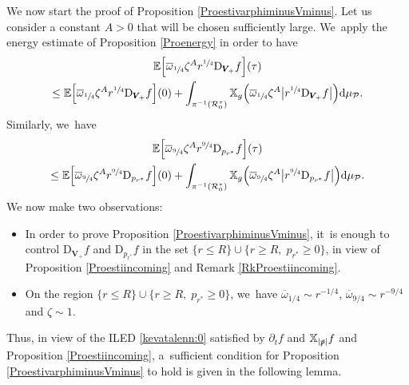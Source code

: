 \documentclass[JEP,XML,SOM,Unicode,published]{cedram}
\theoremstyle{plain}
\theoremstyle{definition}
\newcommand\z{{\zeta}}
\newcommand\T{{\mathbb{X}}}
\newcommand\dr{{\mathrm{d}}}
\begin{document}
We now start the proof of Proposition \ref{ProestivarphiminusVminus}. Let us consider a constant $A>0$ that will be chosen sufficiently large. We~apply the energy estimate of Proposition \ref{Proenergy} in order to have
\begin{multline*}
\mathbb{E} \Bigl[ \overline{\omega}_{\sfrac{1}{4}} \z^A r^{\sfrac{1}{4}}\mathrm{D}_{\pmb{V}_{\!+}} f \Bigr](\tau)\\
\leq \mathbb{E} \Bigl[ \overline{\omega}_{\sfrac{1}{4}} \z^A r^{\sfrac{1}{4}}\mathrm{D}_{\pmb{V}_{\!+}} f \Bigr](0)+\int_{\pi^{-1} (\mathcal{R}_0^\tau)} \T_g \Bigl(\overline{\omega}_{\sfrac{1}{4}} \z^A \big| r^{\sfrac{1}{4}}\mathrm{D}_{\pmb{V}_{\!+}} f \big| \Bigr) \dr \mu_{\mathcal{P}}.
\end{multline*}
Similarly, we~have
\begin{multline*}
\mathbb{E} \Bigl[\overline{\omega}_{\sfrac{9}{4}} \z^A r^{\sfrac{9}{4}}\mathrm{D}_{p_{r^*}} f \Bigr](\tau)\\
\leq \mathbb{E} \Bigl[ \overline{\omega}_{\sfrac{9}{4}} \z^A r^{\sfrac{9}{4}}\mathrm{D}_{p_{r^*}} f \Bigr](0)+\int_{\pi^{-1} (\mathcal{R}_0^\tau)} \T_g \Bigl(\overline{\omega}_{\sfrac{9}{4}} \z^A \big| r^{\sfrac{9}{4}}\mathrm{D}_{p_{r^*}} f \big| \Bigr) \dr \mu_{\mathcal{P}}.
\end{multline*}
We now make two observations:
\begin{itemize}
\item In order to prove Proposition \ref{ProestivarphiminusVminus}, it~is enough to control $\mathrm{D}_{\pmb{V}_{\!+}} f$ and $\mathrm{D}_{p_{r^*}}f$ in the set $\{ r \leq R\} \cup \{ r \geq R, \; p_{r^*} \geq 0 \}$, in view of Proposition \ref{Proestiincoming} and Remark \ref{RkProestiincoming}.
\item On the region $\{ r \leq R\} \cup \{ r \geq R, \; p_{r^*} \geq 0 \}$, we~have $\overline{\omega}_{1/4} \sim r^{-1/4}$, $\overline{\omega}_{9/4} \sim r^{-9/4}$ and $\z \sim 1$.
\end{itemize}
Thus, in view of the ILED \eqref{kevatalenn:0} satisfied by $\partial_t f$ and $\T_{|\slashed{p}|} f$ and Proposition \ref{Proestiincoming}, a~sufficient condition for Proposition \ref{ProestivarphiminusVminus} to hold is given in the following lemma.
\end{document}
